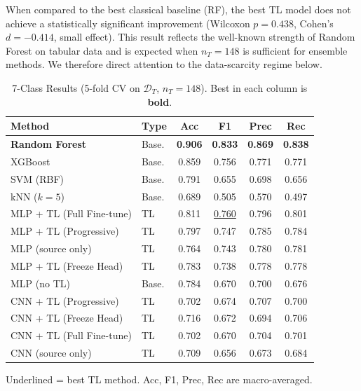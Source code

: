 \documentclass[conference]{IEEEtran}
\begin{document}
When compared to the best classical baseline (RF), the best TL
model does not achieve a statistically significant improvement
(Wilcoxon $p=0.438$, Cohen's $d=-0.414$, small effect).
This result reflects the well-known strength of Random Forest
on tabular data and is expected when $n_T=148$ is sufficient
for ensemble methods.
We therefore direct attention to the data-scarcity regime below.

\begin{table}[t]
  \centering
  \caption{7-Class Results (5-fold CV on $\mathcal{D}_T$, $n_T=148$).
           Best in each column is \textbf{bold}.}
  \label{tab:results7}
  \setlength{\tabcolsep}{4pt}
  \begin{tabular}{llcccc}
    \toprule
    Method & Type & Acc & F1 & Prec & Rec \\
    \midrule
    \textbf{Random Forest}        & Base. & \textbf{0.906} & \textbf{0.833} & \textbf{0.869} & \textbf{0.838} \\
    XGBoost                       & Base. & 0.859 & 0.756 & 0.771 & 0.771 \\
    SVM (RBF)                     & Base. & 0.791 & 0.655 & 0.698 & 0.656 \\
    kNN ($k=5$)                   & Base. & 0.689 & 0.505 & 0.570 & 0.497 \\
    \midrule
    MLP + TL (Full Fine-tune)     & TL    & 0.811 & \underline{0.760} & 0.796 & 0.801 \\
    MLP + TL (Progressive)        & TL    & 0.797 & 0.747 & 0.785 & 0.784 \\
    MLP (source only)             & TL    & 0.764 & 0.743 & 0.780 & 0.781 \\
    MLP + TL (Freeze Head)        & TL    & 0.783 & 0.738 & 0.778 & 0.778 \\
    MLP (no TL)                   & Base. & 0.784 & 0.670 & 0.700 & 0.676 \\
    CNN + TL (Progressive)        & TL    & 0.702 & 0.674 & 0.707 & 0.700 \\
    CNN + TL (Freeze Head)        & TL    & 0.716 & 0.672 & 0.694 & 0.706 \\
    CNN + TL (Full Fine-tune)     & TL    & 0.702 & 0.670 & 0.704 & 0.701 \\
    CNN (source only)             & TL    & 0.709 & 0.656 & 0.673 & 0.684 \\
    \bottomrule
  \end{tabular}
  \vspace{1pt}
  \small{Underlined = best TL method. Acc, F1, Prec, Rec are macro-averaged.}
\end{table}
\end{document}
